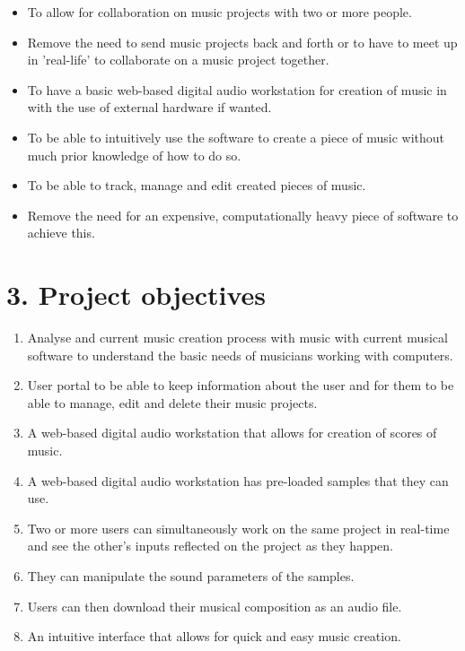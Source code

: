 \documentclass[a4paper]{article}
\begin{document}
\begin{itemize}
    \item[$\alph$] To allow for collaboration on music projects with two or more people.
    \item[$\alph$] Remove the need to send music projects back and forth or to have to meet up in 'real-life' to collaborate on a music project together.
    \item[$\alph$] To have a basic web-based digital audio workstation for creation of music in with the use of external hardware if wanted.
    \item[$\alph$] To be able to intuitively use the software to create a piece of music without much prior knowledge of how to do so.
    \item[$\alph$] To be able to track, manage and edit created pieces of music.
    \item[$\alph$] Remove the need for an expensive, computationally heavy piece of software to achieve this.


\end{itemize}

\section{3. Project objectives}

\begin{enumerate}
    \item Analyse and current music creation process with music with current musical software to understand the basic needs of musicians working with computers.
    \item User portal to be able to keep information about the user and for them to be able to manage, edit and delete their music projects.
    \item A web-based digital audio workstation that allows for creation of scores of music.
    \item A web-based digital audio workstation has pre-loaded samples that they can use.
    \item Two or more users can simultaneously work on the same project in real-time and see the other's inputs reflected on the project as they happen.
    \item They can manipulate the sound parameters of the samples.
    \item Users can then download their musical composition as an audio file.
    \item An intuitive interface that allows for quick and easy music creation.
\end{enumerate}
\end{document}
